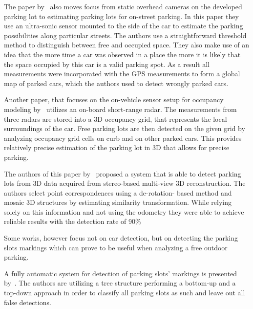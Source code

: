 The paper by~\cite{vladimircoric} also moves focus from static overhead
cameras on the developed parking lot to estimating parking lots for on-street
parking. In this paper they use an ultra-sonic sensor mounted to the side of
the car to estimate the parking possibilities along particular streets. The
authors use a straightforward threshold method to distinguish between free and
occupied space. They also make use of an idea that the more time a car was
observed in a place the more it is likely that the space occupied by this car
is a valid parking spot. As a result all measurements were incorporated with
the GPS measurements to form a global map of parked cars, which the authors
used to detect wrongly parked cars.

Another paper, that focuses on the on-vehicle sensor setup for occupancy
modeling by~\cite{schmid11} utilizes an on-board short-range radar. The
measurements from three radars are stored into a 3D occupancy grid, that
represents the local surroundings of the car. Free parking lots are then
detected on the given grid by analyzing occupancy grid cells on curb and on
other parked cars. This provides relatively precise estimation of the parking
lot in 3D that allows for precise parking.

The authors of this paper by~\cite{suhr10} proposed a system that is able to
detect parking lots from 3D data acquired from stereo-based multi-view 3D
reconstruction. The authors select point correspondences using a de-rotation-
based method and mosaic 3D structures by estimating similarity transformation.
While relying solely on this information and not using the odometry they were
able to achieve reliable results with the detection rate of 90\%

Some works, however focus not on car detection, but on detecting the parking
slots markings which can prove to be useful when analyzing a free outdoor
parking.

A fully automatic system for detection of parking slots' markings is presented
by~\cite{suhr13}. The authors are utilizing a tree structure performing a
bottom-up and a top-down approach in order to classify all parking slots as
such and leave out all false detections.
